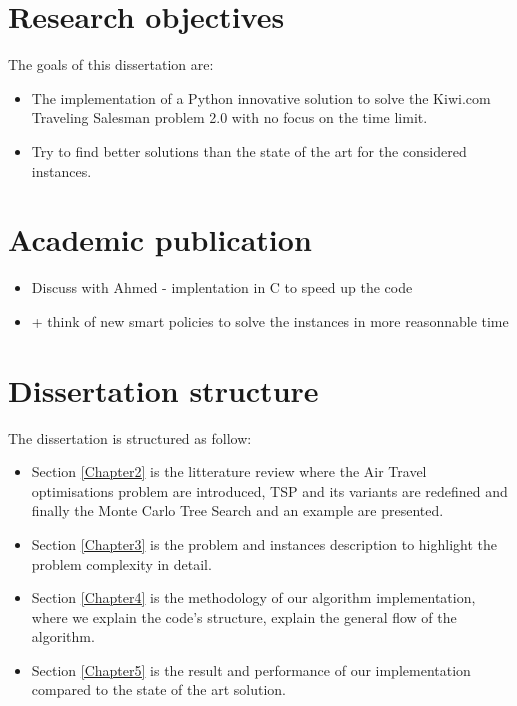 \section{Research objectives}
\label{section:research_obj}
The goals of this dissertation are:
\begin{itemize}
    \item The implementation of a Python innovative solution to solve the Kiwi.com Traveling Salesman problem 2.0 with no focus on the time limit.
    \item Try to find better solutions than the state of the art for the considered instances.

\end{itemize}

\section{Academic publication}
\begin{itemize}
    \item Discuss with Ahmed - implentation in C to speed up the code
    \item + think of new smart policies to solve the instances in more reasonnable time
\end{itemize}

\section{Dissertation structure}

The dissertation is structured as follow:
\begin{itemize}
    \item Section \ref{Chapter2} is the litterature review where the Air Travel optimisations problem are introduced, TSP and its variants are redefined and finally the Monte Carlo Tree Search and an example are presented.
    \item Section \ref{Chapter3} is the problem and instances description to highlight the problem complexity in detail.
    \item Section \ref{Chapter4} is the methodology of our algorithm implementation, where we explain the code's structure, explain the general flow of the algorithm.
    \item Section \ref{Chapter5} is the result and performance of our implementation compared to the state of the art solution.
\end{itemize}

